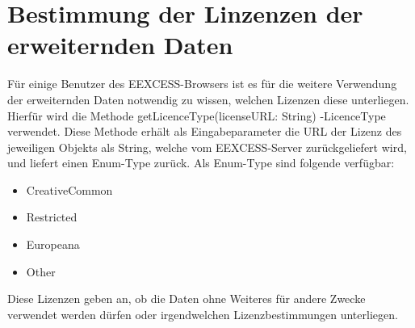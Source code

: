 \documentclass[a4paper,10pt]{article}
\begin{document}
\section{Bestimmung der Linzenzen der erweiternden Daten}
Für einige Benutzer des EEXCESS-Browsers ist es für die weitere Verwendung der erweiternden Daten notwendig zu wissen, welchen Lizenzen diese unterliegen. Hierfür wird die Methode \glqq getLicenceType(licenseURL: String) -\frq LicenceType \grqq verwendet. Diese Methode erhält als Eingabeparameter die URL der Lizenz des jeweiligen Objekts als String, welche vom EEXCESS-Server zurückgeliefert wird, und liefert einen Enum-Type zurück. Als Enum-Type sind folgende verfügbar:
\begin{itemize}
\item CreativeCommon
\item Restricted
\item Europeana
\item Other
\end{itemize}

Diese Lizenzen geben an, ob die Daten ohne Weiteres für andere Zwecke verwendet werden dürfen oder irgendwelchen Lizenzbestimmungen unterliegen.
\end{document}
